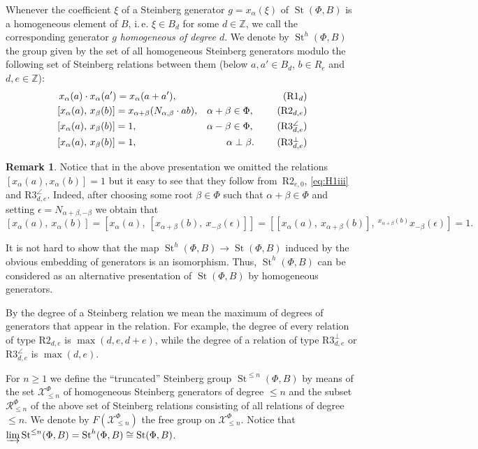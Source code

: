 \documentclass[oneside, 8pt]{amsart}
\theoremstyle{remark}
\theoremstyle{definition}
\numberwithin{lemma}{section}
\numberwithin{prop}{section}
\numberwithin{corollary}{section}
\numberwithin{externaltheorem}{section}
\newtheorem{rem}[lemma]{Remark}
\DeclareMathOperator{\St}{St}
\numberwithin{equation}{section}
\begin{document}
Whenever the coefficient $\xi$ of a Steinberg generator $g = x_\alpha(\xi)$ of $\St(\Phi, B)$ is a homogeneous element of $B$, i.\,e. $\xi \in B_d$ for some $d \in \mathbb{Z}$,
 we call the corresponding generator $g$ {\it homogeneous of degree $d$}.
We denote by $\St^h(\Phi, B)$ the group given by the set of all homogeneous Steinberg generators modulo the following set of Steinberg relations between them
(below $a, a' \in B_d$, $b\in R_e$ and $d,e \in \mathbb{Z}$): 
\begin{align}
&\,\,x_{\alpha}(a)\cdot x_{\alpha}(a') =  x_{\alpha}(a+a'),                        & \tag{R$1_d$} \\
&\,[x_{\alpha}(a),\,x_{\beta}(b)]= x_{\alpha+\beta}(N_{\alpha, \beta} \cdot ab),   & \alpha + \beta \in \Phi,\ \tag{R$2_{d,e}$} \\
&\,[x_{\alpha}(a),\,x_{\beta}(b)]= 1,                                              & \alpha - \beta \in \Phi,\ \tag{R$3^\angle_{d,e}$} \\
&\,[x_{\alpha}(a),\,x_{\beta}(b)]= 1,                                              & \alpha \perp \beta.\ \tag{R$3^\bot_{d,e}$}
\end{align}
\begin{rem}
Notice that in the above presentation we omitted the relations $[x_\alpha(a), x_\alpha(b)] = 1$ but it easy to see that they follow from~$\text{R2}_{e,0}$, \eqref{eq:H1iii} and $\text{R3}_{d,e}^\angle$. Indeed, after choosing some root $\beta\in \Phi$ such that $\alpha+\beta\in\Phi$ and setting $\epsilon = N_{\alpha+\beta,-\beta}$ we obtain that 
\[ [x_\alpha(a),\ x_\alpha(b)] = [x_\alpha(a),\ [x_{\alpha+\beta}(b),\ x_{-\beta}(\epsilon)]] = [[x_\alpha(a),\ x_{\alpha+\beta}(b)],\ {}^{x_{\alpha+\beta}(b)}\!x_{-\beta}(\epsilon)] = 1. \] \end{rem}

It is not hard to show that the map $\St^h(\Phi, B) \to \St(\Phi, B)$ induced by the obvious embedding of generators is an isomorphism. Thus, $\St^h(\Phi, B)$ can be considered as an alternative presentation of $\St(\Phi, B)$ by homogeneous generators.

By the degree of a Steinberg relation we mean the maximum of degrees of generators that appear in the relation.
For example, the degree of every relation of type $\text{R2}_{d,e}$ is $\max(d,e,d+e)$, while the degree of a relation of type $\text{R3}^\bot_{d,e}$ or $\text{R3}^\angle_{d,e}$ is $\max(d,e)$.

For $n\geq 1$ we define the ``truncated'' Steinberg group $\St^{\leq n}(\Phi, B)$ by means of the set $\mathcal{X}_{\leq n}^\Phi$ of homogeneous Steinberg generators of degree $\leq n$ and the subset $\mathcal{R}_{\leq n}^\Phi$ of the above set of Steinberg relations consisting of all relations of degree $\leq n$.  We denote by $F(\mathcal{X}^\Phi_{\leq n})$ the free group on $\mathcal{X}^\Phi_{\leq n}$. Notice that $\varinjlim\limits \St^{\leq n}(\Phi, B) = \St^h(\Phi, B) \cong \St(\Phi, B)$.
\end{document}
